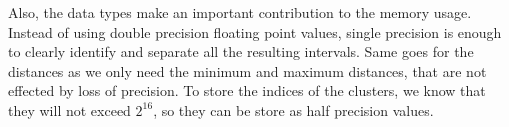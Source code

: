 Also, the data types make an important contribution to the memory usage. Instead of using double precision floating point values, single precision is enough to clearly identify and separate all the resulting intervals. Same goes for the distances as we only need the minimum and maximum distances, that are not effected by loss of precision. To store the indices of the clusters, we know that they will not exceed $2^{16}$, so they can be store as half precision values.